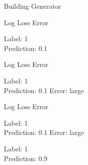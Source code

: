 \documentclass{beamer}
\begin{document}
\begin{frame}{Building Generator} 
    \begin{figure}[h]
        \centering
        \captionsetup{labelformat=empty}
    \end{figure}
\end{frame}


\begin{frame}{Log Loss Error}


\begin{flushleft}
    \Large Label: 1 \\
    \Large Prediction: 0.1 
\end{flushleft}

\end{frame}

\begin{frame}{Log Loss Error}
    

\begin{flushleft}
    \Large Label: 1 \\
    \Large Prediction: 0.1 \hfill Error: large 
\end{flushleft}


\end{frame}

\begin{frame}{Log Loss Error}
    

\begin{flushleft}
    \Large Label: 1 \\
    \Large Prediction: 0.1 \hfill Error: large \hfill 
\end{flushleft}

\begin{flushleft}
    \Large Label: 1\\
    \Large Prediction: 0.9 \hfill
\end{flushleft}
\end{frame}
\end{document}
